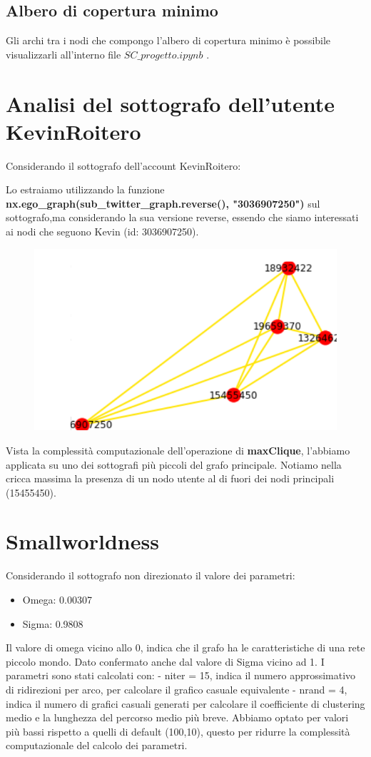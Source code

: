 \documentclass[a4paper,11pt]{report}
\begin{document}
\subsection{Albero di copertura minimo}
Gli archi tra i nodi che compongo l'albero di copertura minimo è possibile visualizzarli all'interno file $SC\_progetto.ipynb$ .

\section{Analisi del sottografo dell'utente KevinRoitero}
Considerando il sottografo dell'account KevinRoitero:

Lo estraiamo utilizzando la funzione \textbf{nx.ego\_graph(sub\_twitter\_graph.reverse(), "3036907250")} sul sottografo,ma considerando la sua versione reverse, essendo che siamo interessati ai nodi che seguono Kevin (id: 3036907250).\\
\begin{figure}[h]
	\centering
	\includegraphics[height=0.35\linewidth]{cricca_kevin}
	\label{fig:criccakevin}
\end{figure}

Vista la complessità computazionale dell'operazione di \textbf{maxClique}, l'abbiamo applicata su uno dei sottografi più piccoli del grafo principale. Notiamo nella cricca massima la presenza di un nodo utente al di fuori dei nodi principali (15455450).
\pagebreak
\section{Smallworldness}
Considerando il sottografo non direzionato il valore dei parametri:
	\begin{itemize}
	\item Omega: 0.00307
	\item Sigma: 0.9808
\end{itemize}
Il valore di omega vicino allo 0, indica che il grafo ha le caratteristiche di una rete piccolo mondo.
Dato confermato anche dal valore di Sigma vicino ad 1.
I parametri sono stati calcolati con:\newline
- niter = 15, indica il numero approssimativo di ridirezioni per arco, per calcolare il grafico casuale equivalente\newline
- nrand = 4, indica il numero di grafici casuali generati per calcolare il coefficiente di clustering medio e la lunghezza del percorso medio più breve.\newline
Abbiamo optato per valori più bassi rispetto a quelli di default (100,10), questo per ridurre la complessità computazionale del calcolo dei parametri.
\end{document}
